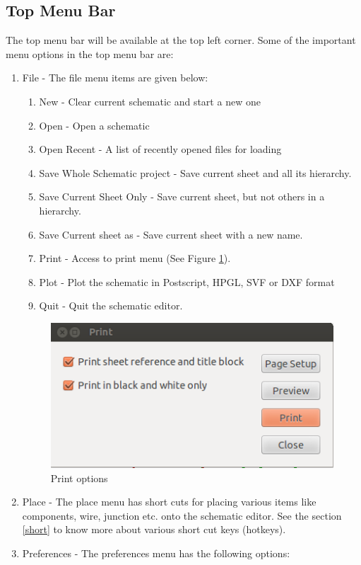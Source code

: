 \subsection{Top Menu Bar}
The top menu bar will be available at the top left corner.
Some of the important menu options in the top menu bar are:
\begin{enumerate}
\item File - 
The file menu items are given below:
\begin{enumerate}
\item New - Clear current schematic and start a new one
\item Open - Open a schematic 
\item Open Recent - A list of recently opened files for loading
\item Save Whole Schematic project - Save current sheet and all its hierarchy.
\item Save Current Sheet Only - Save current sheet, but not others in a hierarchy.
\item Save Current sheet as - Save current sheet with a new name.
\item Print - Access to print menu (See Figure \ref{print}).
\item Plot - Plot the schematic in Postscript, HPGL, SVF or DXF format 
\item Quit - Quit the schematic editor. 
\end{enumerate}
\begin{figure}
\begin{center}
\includegraphics[width=0.5\linewidth]{figures/print.png}%
\caption{Print options}
\label{print}
\end{center}
\end{figure}
\item Place - 
The place menu has short cuts for placing various items like components, wire, junction etc. onto the schematic editor. See the section \ref{short} to know more about various short cut keys (hotkeys).
\item Preferences - 
The preferences menu has the following options:
\begin{enumerate}

\end{enumerate}
\end{enumerate}
